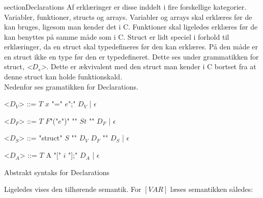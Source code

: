 \noindent \subsubsection{}section{Declarations}
Af erklæringer er disse inddelt i fire forskellige kategorier. Variabler, funktioner, structs og arrays. 
Variabler og arrays skal erklæres før de kan bruges, ligesom man kender det i C. Funktioner skal ligeledes erklæres før de kan benyttes på samme måde som i C. Struct er lidt speciel i forhold til erklæringer, da en struct skal typedefineres før den kan erklæres. På den måde er en struct ikke en type før den er typedefineret. Dette ses under grammatikken for struct,  \textit{<$D_s$>}. Dette er ækvivalent med den struct man kender i C bortset fra at denne struct kan holde funktionskald.\\

\noindent Nedenfor ses gramatikken for Declarations.

\begin{Grammar}
 \begin{grammar}
 <$D_V$> ::= $T$ $x$ "=" $e$";" $D_V$ | $\epsilon$
 
 <$D_F$> ::= $T$ $F$"("$e$")" "{" $St$ "}" $D_F$ | $\epsilon$
 
 <$D_S$> ::= "struct" $S$ "{" $D_V$ $D_F$ "}" $D_S$ | $\epsilon$
 
 <$D_A$> ::= $T$ A "[" $i$ "];" $D_A$ | $\epsilon$
 \end{grammar}
 \caption{Abstrakt syntaks for Declarations}\label{gra:declarations}
\end{Grammar}

\noindent Ligeledes vises den tilhørende semantik. For $[VAR]$ læses semantikken således:
